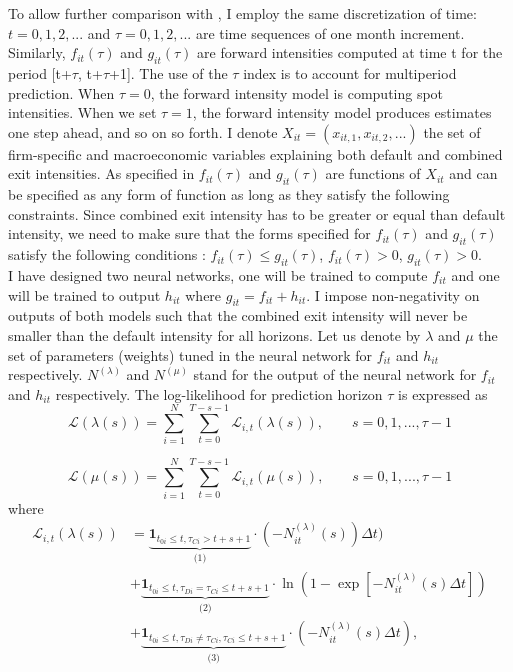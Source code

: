 To allow further comparison with \citet{Duan2012},  I employ the same discretization of time: $t = 0, 1, 2,...$ and $\tau = 0, 1, 2,...$ are time sequences of one month increment. Similarly, $f_{it}(\tau)$ and $g_{it}(\tau)$ are forward intensities computed at time t for the period [t+$\tau$, t+$\tau$+1]. The use of the $\tau$ index is to account for multiperiod prediction. When $\tau = 0$, the forward intensity model is computing spot intensities. When we set $\tau = 1$, the forward intensity model produces estimates one step ahead, and so on so forth. I denote $X_{it} = (x_{it,1}, x_{it,2} ,...)$ the set of firm-specific and macroeconomic variables explaining both default and combined exit intensities. As specified in \citet{Duan2012} $f_{it}(\tau)$ and $g_{it}(\tau)$ are functions of $X_{it}$ and can be specified as any form of function as long as they satisfy the following constraints. Since combined exit intensity has to be greater or equal than default intensity, we need to make sure that the forms specified for $f_{it}(\tau)$ and $g_{it}(\tau)$ satisfy the following conditions : $f_{it}(\tau) \leq g_{it}(\tau)$, $f_{it}(\tau) > 0$, $g_{it}(\tau) > 0$. \\

I have designed two neural networks, one will be trained to compute $f_{it}$ and one will be trained to output $h_{it}$ where $g_{it} = f_{it} + h_{it}$. I impose non-negativity on outputs of both models such that the combined exit intensity will never be smaller than the default intensity for all horizons. Let us denote by $\lambda$ and $\mu$ the set of parameters (weights) tuned in the neural network for $f_{it}$ and $h_{it}$ respectively. $N^{(\lambda)}$ and $N^{(\mu)}$ stand for the output of the neural network for $f_{it}$ and $h_{it}$ respectively. The log-likelihood for prediction horizon $\tau$ is expressed as
\begin{equation} \label{decomp1}
\mathcal{L}(\lambda(s)) = \sum_{i=1}^N \sum_{t=0}^{T-s-1} \mathcal{L}_{i,t}(\lambda(s)), \qquad s = 0,1,...,\tau-1
\end{equation}

\begin{equation} \label{decomp2}
\mathcal{L}(\mu(s)) = \sum_{i=1}^N \sum_{t=0}^{T-s-1} \mathcal{L}_{i,t}(\mu(s)), \qquad s = 0,1,...,\tau-1
\end{equation}
where 
\begin{align} \label{small_lik_f}
\mathcal{L}_{i,t}(\lambda(s)) &= \underbrace{\textbf{1}_{t_{0i} \leq t,\tau_{Ci} > t + s +1}}_\textrm{(1)} \cdot (-N_{it}^{(\lambda)}(s)) \Delta t)\\ \nonumber
&+ \underbrace{\textbf{1}_{t_{0i} \leq t, \tau_{Di}=\tau_{Ci} \leq t+s+1}}_\textrm{(2)} \cdot \ln(1-\exp[-N_{it}^{(\lambda)}(s)\Delta t]) \\
&+ \underbrace{\textbf{1}_{t_{0i} \leq t, \tau_{Di} \neq \tau_{Ci}, \tau_{Ci} \leq t+s+1}}_\textrm{(3)} \cdot (-N_{it}^{(\lambda)}(s)\Delta t) \nonumber,
\end{align}


